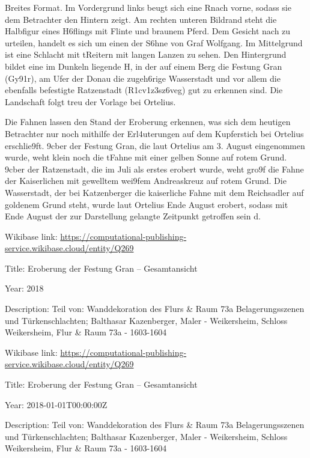 \documentclass[
  a4paper,
  portrait]{book}
\begin{document}
Breites Format. Im Vordergrund links beugt sich eine
R\xbcckenfigur nach vorne, sodass sie dem Betrachter den Hintern
zeigt. Am rechten unteren Bildrand steht die Halbfigur eines
H\xb6flings mit Flinte und braunem Pferd. Dem Gesicht nach zu
urteilen, handelt es sich um einen der S\xb6hne von Graf Wolfgang.
Im Mittelgrund ist eine Schlacht mit t\xbcrkischen Reitern mit
langen Lanzen zu sehen. Den Hintergrund bildet eine im Dunkeln liegende
H\xbcgellandschaft, in der auf einem Berg die Festung Gran
(Gy\x91r), am Ufer der Donau die zugeh\xb6rige Wasserstadt und
vor allem die ebenfalls befestigte Ratzenstadt
(R\xa1cv\xa1z\xb3sz\xb6veg) gut zu erkennen sind. Die
Landschaft folgt treu der Vorlage bei Ortelius.

Die Fahnen lassen den Stand der Eroberung erkennen, was sich dem
heutigen Betrachter nur noch mithilfe der Erl\xa4uterungen auf dem
Kupferstich bei Ortelius erschlie\x9ft. \x9cber der Festung
Gran, die laut Ortelius am 3. August eingenommen wurde, weht klein noch
die t\xbcrkische Fahne mit einer gelben Sonne auf rotem Grund.
\x9cber der Ratzenstadt, die im Juli als erstes erobert wurde, weht
gro\x9f die Fahne der Kaiserlichen mit gewelltem wei\x9fem
Andreaskreuz auf rotem Grund. Die Wasserstadt, \xbcber der bei
Katzenberger die kaiserliche Fahne mit dem Reichsadler auf goldenem
Grund steht, wurde laut Ortelius Ende August erobert, sodass mit Ende
August der zur Darstellung gelangte Zeitpunkt getroffen sein
d\xbcrfte.

Wikibase link:
\url{https://computational-publishing-service.wikibase.cloud/entity/Q269}

Title: Eroberung der Festung Gran -- Gesamtansicht

Year: 2018

Description: Teil von: Wanddekoration des Flurs \& Raum 73a
Belagerungsszenen und Türkenschlachten; Balthasar Kazenberger, Maler -
Weikersheim, Schloss Weikersheim, Flur \& Raum 73a - 1603-1604

Wikibase link:
\url{https://computational-publishing-service.wikibase.cloud/entity/Q269}

Title: Eroberung der Festung Gran -- Gesamtansicht

Year: 2018-01-01T00:00:00Z

Description: Teil von: Wanddekoration des Flurs \& Raum 73a
Belagerungsszenen und Türkenschlachten; Balthasar Kazenberger, Maler -
Weikersheim, Schloss Weikersheim, Flur \& Raum 73a - 1603-1604
\end{document}
